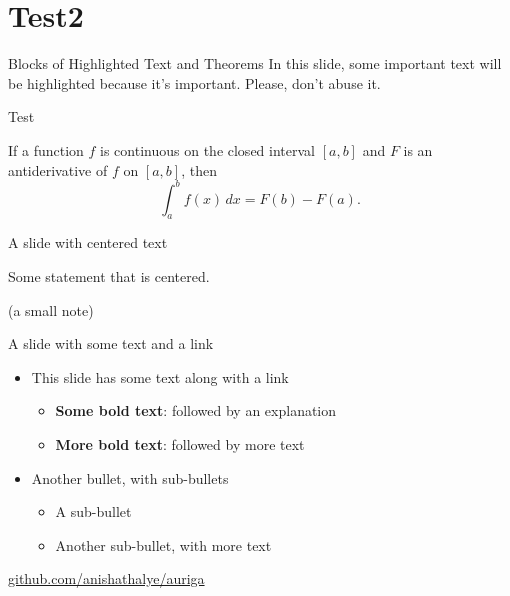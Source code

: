 \documentclass[12pt,aspectratio=169]{beamer}
\begin{document}
\section{Test2}
\begin{frame}{Blocks of Highlighted Text and Theorems}
In this slide, some important text will be \alert{highlighted} because it's important. Please, don't abuse it.

\begin{mdframed}
Test
\end{mdframed}

\begin{theorem}
If a function \( f \) is continuous on the closed interval \([a, b]\) and \( F \) is an antiderivative of \( f \) on \([a, b]\), then
\[ \int_a^b f(x) \, dx = F(b) - F(a). \]
\end{theorem}

\end{frame}

\begin{frame}{A slide with centered text}

  \begin{center}
    Some statement that is centered.
  \end{center}

  \vspace{2ex}
  \begin{center}
    \scriptsize (a small note)
  \end{center}

\end{frame}

\begin{frame}{A slide with some text and a link}

  \begin{itemize}
    \item This slide has some text along with a link
      \begin{itemize}
        \item \textbf{Some bold text}: followed by an explanation
        \item \textbf{More bold text}: followed by more text
      \end{itemize}
    \item Another bullet, with sub-bullets
      \begin{itemize}
        \item A sub-bullet
        \item Another sub-bullet, with more text
      \end{itemize}
  \end{itemize}

  \vspace{2ex}
  \begin{center}
    \color{blue} \href{https://github.com/anishathalye/auriga}{github.com/anishathalye/auriga}
  \end{center}

\end{frame}
\end{document}
